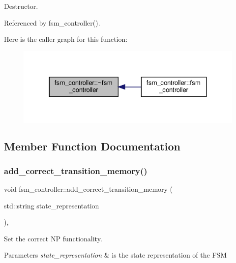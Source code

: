 Destructor. 



Referenced by fsm\+\_\+controller().

Here is the caller graph for this function\+:
\nopagebreak
\begin{figure}[H]
\begin{center}
\leavevmode
\includegraphics[width=324pt]{da/d3d/classfsm__controller_a034fb9431bbb26b2477720a27fb3d176_icgraph}
\end{center}
\end{figure}


\subsection{Member Function Documentation}
\mbox{\label{classfsm__controller_a80e22f1c0437e36734f4339828e44e68}} 
\subsubsection{\texorpdfstring{add\+\_\+correct\+\_\+transition\+\_\+memory()}{add\_correct\_transition\_memory()}}
{\footnotesize\ttfamily void fsm\+\_\+controller\+::add\+\_\+correct\+\_\+transition\+\_\+memory (\begin{DoxyParamCaption}\item[{std\+::string}]{state\+\_\+representation }\end{DoxyParamCaption})\hspace{0.3cm}{\ttfamily [protected]}, {\ttfamily [virtual]}}



Set the correct NP functionality. 


\begin{DoxyParams}{Parameters}
{\em state\+\_\+representation} & is the state representation of the F\+SM \\
\hline
\end{DoxyParams}


